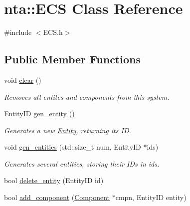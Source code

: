 \hypertarget{classnta_1_1ECS}{}\section{nta\+:\+:E\+CS Class Reference}
\label{classnta_1_1ECS}


{\ttfamily \#include $<$E\+C\+S.\+h$>$}

\subsection*{Public Member Functions}
\begin{DoxyCompactItemize}
\item 
\mbox{\label{classnta_1_1ECS_a90b0a89b5a954f2a67465d2487cd8afb}} 
void \hyperlink{classnta_1_1ECS_a90b0a89b5a954f2a67465d2487cd8afb}{clear} ()
\begin{DoxyCompactList}\small\item\em Removes all entites and components from this system. \end{DoxyCompactList}\item 
\mbox{\label{classnta_1_1ECS_abd79432cd214f155658835dbc9ec02da}} 
Entity\+ID \hyperlink{classnta_1_1ECS_abd79432cd214f155658835dbc9ec02da}{gen\+\_\+entity} ()
\begin{DoxyCompactList}\small\item\em Generates a new \hyperlink{classnta_1_1Entity}{Entity}, returning its ID. \end{DoxyCompactList}\item 
\mbox{\label{classnta_1_1ECS_aebaa7058c7a45f66faf847a1b302b332}} 
void \hyperlink{classnta_1_1ECS_aebaa7058c7a45f66faf847a1b302b332}{gen\+\_\+entities} (std\+::size\+\_\+t num, Entity\+ID $\ast$ids)
\begin{DoxyCompactList}\small\item\em Generates several entities, storing their I\+Ds in ids. \end{DoxyCompactList}\item 
bool \hyperlink{classnta_1_1ECS_a5135be7c630456684a354563a18855c3}{delete\+\_\+entity} (Entity\+ID id)
\item 
bool \hyperlink{classnta_1_1ECS_a3388e8ae1ef45258356c742efcc00048}{add\+\_\+component} (\hyperlink{classnta_1_1Component}{Component} $\ast$cmpn, Entity\+ID entity)
\item 

\end{DoxyCompactItemize}
